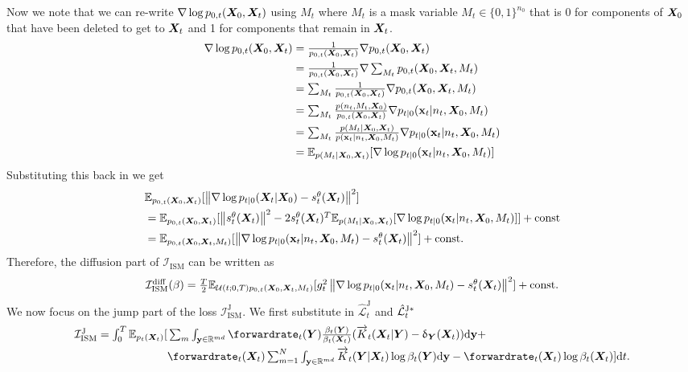 Now we note that we can re-write $\nabla \log p_{0,t}({\bm{X}}_0, {\bm{X}}_t)$ using $M_t$ where $M_t$ is a mask variable $M_t \in \{0, 1\}^{n_0}$ that is 0 for components of ${\bm{X}}_0$ that have been deleted to get to ${\bm{X}}_t$ and 1 for components that remain in ${\bm{X}}_t$.
\begin{align}
    \nabla \log p_{0,t}({\bm{X}}_0, {\bm{X}}_t) &\textstyle = \frac{1}{p_{0,t}({\bm{X}}_0, {\bm{X}}_t)} \nabla p_{0,t}({\bm{X}}_0, {\bm{X}}_t) \\
    &\textstyle = \frac{1}{p_{0,t}({\bm{X}}_0, {\bm{X}}_t)} \nabla \sum_{M_t} p_{0,t}({\bm{X}}_0, {\bm{X}}_t, M_t)\\
    &\textstyle = \sum_{M_t} \frac{1}{p_{0,t}({\bm{X}}_0, {\bm{X}}_t)} \nabla p_{0,t}({\bm{X}}_0, {\bm{X}}_t, M_t)\\
    &\textstyle = \sum_{M_t} \frac{p(n_t, M_t, {\bm{X}}_0)}{p_{0,t}({\bm{X}}_0, {\bm{X}}_t)} \nabla p_{t|0}({\mathbf{x}}_t | n_t, {\bm{X}}_0, M_t)\\
    &\textstyle = \sum_{M_t} \frac{p(M_t | {\bm{X}}_0, {\bm{X}}_t)}{p({\mathbf{x}}_t | n_t, {\bm{X}}_0, M_t)} \nabla p_{t|0}({\mathbf{x}}_t | n_t, {\bm{X}}_0, M_t)\\
    &\textstyle = \mathbb{E}_{p(M_t | {\bm{X}}_0, {\bm{X}}_t)} [ \nabla \log p_{t|0}({\mathbf{x}}_t | n_t, {\bm{X}}_0, M_t) ]
\end{align}
Substituting this back in we get
\begin{align}
     &\textstyle \mathbb{E}_{p_{0, t}({\bm{X}}_0, {\bm{X}}_t) } [ \left\lVert \nabla \log p_{t|0}({\bm{X}}_t | {\bm{X}}_0) - s_t^\theta({\bm{X}}_t) \right\rVert^2 ] \\
     &\textstyle = \mathbb{E}_{p_{0,t}({\bm{X}}_0, {\bm{X}}_t)} [ \left\lVert s_t^\theta({\bm{X}}_t)\right\rVert^2 - 2 s_t^\theta({\bm{X}}_t)^T \mathbb{E}_{p(M_t | {\bm{X}}_0, {\bm{X}}_t)} [ \nabla \log p_{t|0}({\mathbf{x}}_t | n_t, {\bm{X}}_0, M_t) ] ] + \text{const}\\
     &\textstyle = \mathbb{E}_{p_{0,t}({\bm{X}}_0, {\bm{X}}_t, M_t)} [ \left\lVert\nabla \log p_{t|0}({\mathbf{x}}_t | n_t, {\bm{X}}_0, M_t) - s_t^\theta({\bm{X}}_t) \right\rVert^2 ] + \text{const} . 
\end{align}
Therefore, the diffusion part of $\mathcal{I}_{\text{ISM}}$ can be written as
\begin{equation}
\textstyle     \mathcal{I}_{\text{ISM}}^{\text{diff}}(\beta) = \frac{T}{2} \mathbb{E}_{\mathcal{U}(t; 0, T) p_{0,t}({\bm{X}}_0, {\bm{X}}_t, M_t) } [g_t^2 \left\lVert\nabla \log p_{t|0}({\mathbf{x}}_t | n_t, {\bm{X}}_0, M_t) - s_t^\theta({\bm{X}}_t)\right\rVert^2 ] + \text{const} . 
\end{equation}
We now focus on the jump part of the loss $\mathcal{I}_{\text{ISM}}^{\text{J}}$. We first substitute in $\hat{\mathcal{L}}^{\text{J}}_t$ and $\hat{\mathcal{L}}^{\text{J}* }_t$
\begin{align}
    \textstyle \mathcal{I}_{\text{ISM}}^{\text{J}} = \int_0^T \mathbb{E}_{p_t(\mX_t)} [&\textstyle  \sum_m \int_{\y \in \mathbb{R}^{md}} \forwardrate_t(\mY) \frac{\beta_t(\mY)}{\beta_t(\mX_t)} ( \ftk_t(\mX_t | \mY) - \updelta_{\mY} (\mX_t) ) \rmd\y + \\
    &\textstyle \forwardrate_t(\mX_t) \inty \ftk_t(\mY | \mX_t) \log \beta_t(\mY) \rmd\y - \forwardrate_t(\mX_t) \log \beta_t(\mX_t)] \rmd t. \label{eq:def_ism_j}
\end{align}
